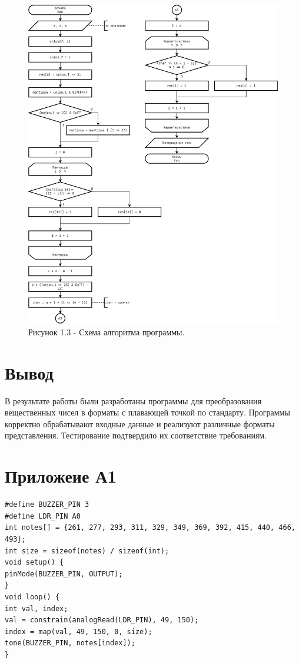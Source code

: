 \documentclass[oneside,a4paper,14pt]{extarticle}
\begin{document}
\begin{figure}[h!]
	\centering
    \includegraphics[height=0.9\textheight]{pics/5_flowchart_p3.png}
	\caption*{Рисунок 1.3 - Схема алгоритма программы.}
\end{figure}

\newpage
\section*{Вывод}
В результате работы были разработаны программы для преобразования
вещественных чисел в форматы с плавающей точкой по стандарту. Программы
корректно обрабатывают входные данные и реализуют различные форматы
представления. Тестирование подтвердило их соответствие требованиям.\\

\section*{Приложеие А1}
\begingroup
\fontsize{14pt}{10pt}\selectfont
\linespread{1}
\begin{verbatim}
#define BUZZER_PIN 3
#define LDR_PIN A0
int notes[] = {261, 277, 293, 311, 329, 349, 369, 392, 415, 440, 466, 493};
int size = sizeof(notes) / sizeof(int);
void setup() {
pinMode(BUZZER_PIN, OUTPUT);
}
void loop() {
int val, index;
val = constrain(analogRead(LDR_PIN), 49, 150);
index = map(val, 49, 150, 0, size);
tone(BUZZER_PIN, notes[index]);
}
\end{verbatim}
\endgroup
\end{document}
